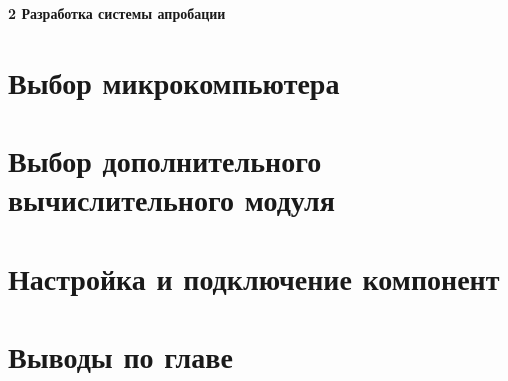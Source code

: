 \newpage
\begin{flushleft}
  \textbf{\large 2 Разработка системы апробации }
\end{flushleft}

\section{Выбор микрокомпьютера}

\section{Выбор дополнительного вычислительного модуля}

\section{Настройка и подключение компонент}

\section{Выводы по главе}